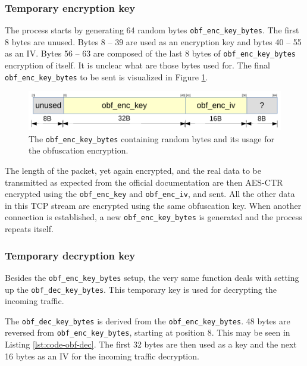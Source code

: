 \documentclass[thesis=M,english]{FITthesis}[2012/10/20]
\begin{document}
\subsubsection{Temporary encryption key}\label{code-obf-enc-key}

The process starts by generating 64 random bytes \texttt{obf\_enc\_key\_bytes}. The first 8 bytes are unused. Bytes 8 -- 39 are used as an encryption key and bytes 40 -- 55 as an IV. Bytes 56 -- 63 are composed of the last 8 bytes of \texttt{obf\_enc\_key\_bytes} encryption of itself. It is unclear what are those bytes used for. The final \texttt{obf\_enc\_key\_bytes} to be sent is visualized in Figure \ref{img:code-obfuscation-bytes-sent}.

\begin{figure}[htb]
	\centering
	\includegraphics[width=1\textwidth]{bytes-sent.pdf}
	\caption[Random bytes used for obfuscation]{The \texttt{obf\_enc\_key\_bytes} containing random bytes and its usage for the obfuscation encryption.}
	\label{img:code-obfuscation-bytes-sent}
\end{figure}

The length of the packet, yet again encrypted, and the real data to be transmitted as expected from the official documentation are then AES-CTR encrypted using the \texttt{obf\_enc\_key} and \texttt{obf\_enc\_iv}, and sent. All the other data in this TCP stream are encrypted using the same obfuscation key. When another connection is established, a new \texttt{obf\_enc\_key\_bytes} is generated and the process repeats itself.

\subsubsection{Temporary decryption key}

Besides the \texttt{obf\_enc\_key\_bytes} setup, the very same function deals with setting up the \texttt{obf\_dec\_key\_bytes}. This temporary key is used for decrypting the incoming traffic.

The \texttt{obf\_dec\_key\_bytes} is derived from the \texttt{obf\_enc\_key\_bytes}. 48 bytes are reversed from \texttt{obf\_enc\_key\_bytes}, starting at position 8. This may be seen in Listing \ref{lst:code-obf-dec}. The first 32 bytes are then used as a key and the next 16 bytes as an IV for the incoming traffic decryption.
\end{document}

